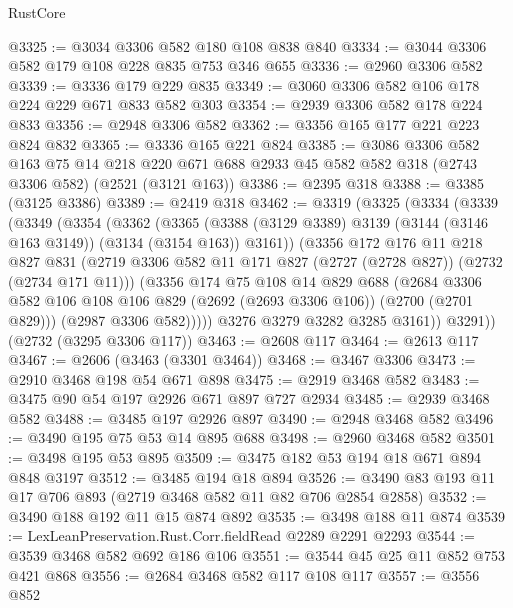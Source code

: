 \begin{lexlean}{RustCore}
\begin{coremodule}
@3325 := @3034 @3306 @582 @180 @108 @838 @840
@3334 := @3044 @3306 @582 @179 @108 @228 @835 @753 @346 @655
@3336 := @2960 @3306 @582
@3339 := @3336 @179 @229 @835
@3349 := @3060 @3306 @582 @106 @178 @224 @229 @671 @833 @582 @303
@3354 := @2939 @3306 @582 @178 @224 @833
@3356 := @2948 @3306 @582
@3362 := @3356 @165 @177 @221 @223 @824 @832
@3365 := @3336 @165 @221 @824
@3385 := @3086
    @3306
    @582
    @163
    @75
    @14
    @218
    @220
    @671
    @688
    @2933
    @45
    @582
    @582
    @318
    (@2743 @3306 @582)
    (@2521 (@3121 @163))
@3386 := @2395 @318
@3388 := @3385 (@3125 @3386)
@3389 := @2419 @318
@3462 := @3319
    (@3325
      (@3334
        (@3339
          (@3349
            (@3354
              (@3362
                (@3365
                  (@3388 (@3129 @3389) @3139 (@3144 (@3146 @163 @3149)) (@3134 (@3154 @163)) @3161))
                (@3356
                  @172
                  @176
                  @11
                  @218
                  @827
                  @831
                  (@2719 @3306 @582 @11 @171 @827 (@2727 (@2728 @827)) (@2732 (@2734 @171 @11)))
                  (@3356
                    @174
                    @75
                    @108
                    @14
                    @829
                    @688
                    (@2684
                      @3306
                      @582
                      @106
                      @108
                      @106
                      @829
                      (@2692 (@2693 @3306 @106))
                      (@2700 (@2701 @829)))
                    (@2987 @3306 @582)))))
            @3276
            @3279
            @3282
            @3285
            @3161))
        @3291))
    (@2732 (@3295 @3306 @117))
@3463 := @2608 @117
@3464 := @2613 @117
@3467 := @2606 (@3463 (@3301 @3464))
@3468 := @3467 @3306
@3473 := @2910 @3468 @198 @54 @671 @898
@3475 := @2919 @3468 @582
@3483 := @3475 @90 @54 @197 @2926 @671 @897 @727 @2934
@3485 := @2939 @3468 @582
@3488 := @3485 @197 @2926 @897
@3490 := @2948 @3468 @582
@3496 := @3490 @195 @75 @53 @14 @895 @688
@3498 := @2960 @3468 @582
@3501 := @3498 @195 @53 @895
@3509 := @3475 @182 @53 @194 @18 @671 @894 @848 @3197
@3512 := @3485 @194 @18 @894
@3526 := @3490 @83 @193 @11 @17 @706 @893 (@2719 @3468 @582 @11 @82 @706 @2854 @2858)
@3532 := @3490 @188 @192 @11 @15 @874 @892
@3535 := @3498 @188 @11 @874
@3539 := LexLeanPreservation.Rust.Corr.fieldRead @2289 @2291 @2293
@3544 := @3539 @3468 @582 @692 @186 @106
@3551 := @3544 @45 @25 @11 @852 @753 @421 @868
@3556 := @2684 @3468 @582 @117 @108 @117
@3557 := @3556 @852

\end{coremodule}
\end{lexlean}
